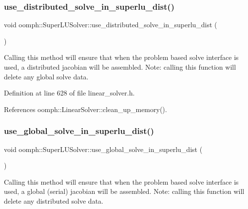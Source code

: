\subsubsection{\texorpdfstring{use\+\_\+distributed\+\_\+solve\+\_\+in\+\_\+superlu\+\_\+dist()}{use\_distributed\_solve\_in\_superlu\_dist()}}
{\footnotesize\ttfamily void oomph\+::\+Super\+L\+U\+Solver\+::use\+\_\+distributed\+\_\+solve\+\_\+in\+\_\+superlu\+\_\+dist (\begin{DoxyParamCaption}{ }\end{DoxyParamCaption})\hspace{0.3cm}{\ttfamily [inline]}}



Calling this method will ensure that when the problem based solve interface is used, a distributed jacobian will be assembled. Note\+: calling this function will delete any global solve data. 



Definition at line 628 of file linear\+\_\+solver.\+h.



References oomph\+::\+Linear\+Solver\+::clean\+\_\+up\+\_\+memory().

\mbox{\label{classoomph_1_1SuperLUSolver_a4eac19f126f7da82f6af48416410442a}} 
\subsubsection{\texorpdfstring{use\+\_\+global\+\_\+solve\+\_\+in\+\_\+superlu\+\_\+dist()}{use\_global\_solve\_in\_superlu\_dist()}}
{\footnotesize\ttfamily void oomph\+::\+Super\+L\+U\+Solver\+::use\+\_\+global\+\_\+solve\+\_\+in\+\_\+superlu\+\_\+dist (\begin{DoxyParamCaption}{ }\end{DoxyParamCaption})\hspace{0.3cm}{\ttfamily [inline]}}



Calling this method will ensure that when the problem based solve interface is used, a global (serial) jacobian will be assembled. Note\+: calling this function will delete any distributed solve data. 



